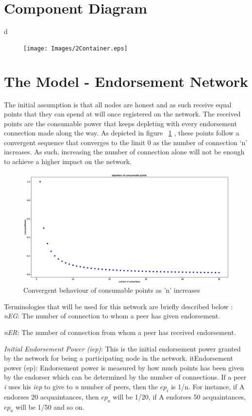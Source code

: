 \section{Component Diagram}
d
\begin{figure}
	\texttt{[image: Images/2Container.eps]}
\end{figure}


\section{The Model - Endorsement Network}
The initial assumption is that all nodes are honest and as such receive equal
points that they can spend at will once registered on the network. The received
points are the consumable power that keeps depleting with every endorsement
connection made along the way. As depicted in figure ~\ref{consumablePoint} ,
these points follow a convergent sequence that converges to the limit 0 as the
number of connection `n' increases. As such, increasing the number of
connection alone will not be enough to achieve a higher impact on the network.
\\
\begin{figure}
	\centering
	\includegraphics[width=1.0\textwidth]{Images/ConsumablePoints.eps}
	\caption{Convergent behaviour of consumable points as 'n' increases}
	\label{consumablePoint}
\end{figure}


Terminologies that will be used for this network are briefly described below : \\
\textit{nEG}: The number of connection to whom a peer has given endorsement.

\textit{nER}: The number of connection from whom a peer has received endorsement. 


\textit{Initial Endorsement Power (iep)}: This is the initial endorsement power 
granted by the network for being a participating node in the network. 
it{Endorsement power (ep):} Endorsement power is measured by how much points 
has been given by the endorser which can be determined by the number of 
connections. If a peer \textit{i} uses his \textit{iep} to give to \textit{n} 
number of peers, then the $ep_i$ is 1/n. For instance, if A endorses 
20 acquaintances, then $ep_a$ will be 1/20, if A endorses 50 
acquaintances, $ep_a$ will be 1/50 and so on. 

